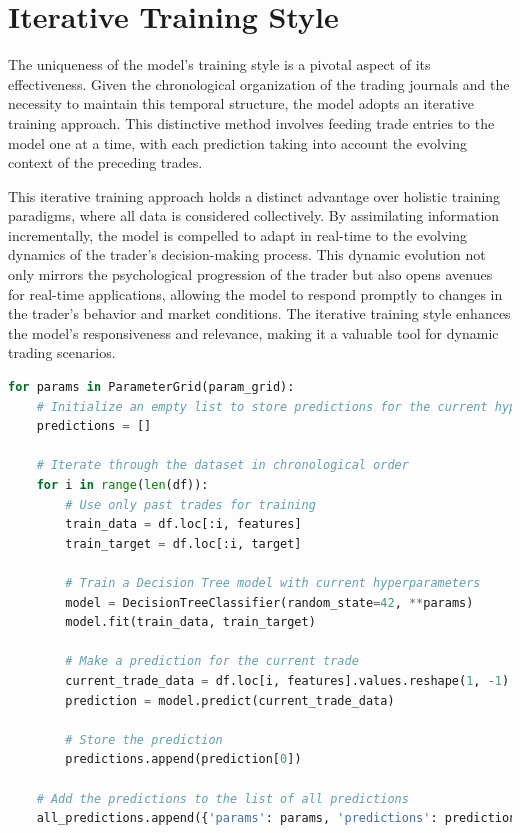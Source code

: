 \documentclass{article}
\begin{document}
\section{Iterative Training Style}
The uniqueness of the model's training style is a pivotal aspect of its effectiveness. Given the chronological organization of the trading journals and the necessity to maintain this temporal structure, the model adopts an iterative training approach. This distinctive method involves feeding trade entries to the model one at a time, with each prediction taking into account the evolving context of the preceding trades.

This iterative training approach holds a distinct advantage over holistic training paradigms, where all data is considered collectively. By assimilating information incrementally, the model is compelled to adapt in real-time to the evolving dynamics of the trader's decision-making process. This dynamic evolution not only mirrors the psychological progression of the trader but also opens avenues for real-time applications, allowing the model to respond promptly to changes in the trader's behavior and market conditions. The iterative training style enhances the model's responsiveness and relevance, making it a valuable tool for dynamic trading scenarios.

\begin{lstlisting}[language=Python, caption={Iterative Training Approach}, label={lst:python}]
for params in ParameterGrid(param_grid):
    # Initialize an empty list to store predictions for the current hyperparameters
    predictions = []

    # Iterate through the dataset in chronological order
    for i in range(len(df)):
        # Use only past trades for training
        train_data = df.loc[:i, features]
        train_target = df.loc[:i, target]

        # Train a Decision Tree model with current hyperparameters
        model = DecisionTreeClassifier(random_state=42, **params)
        model.fit(train_data, train_target)

        # Make a prediction for the current trade
        current_trade_data = df.loc[i, features].values.reshape(1, -1)
        prediction = model.predict(current_trade_data)

        # Store the prediction
        predictions.append(prediction[0])

    # Add the predictions to the list of all predictions
    all_predictions.append({'params': params, 'predictions': predictions})
\end{lstlisting}
\end{document}
